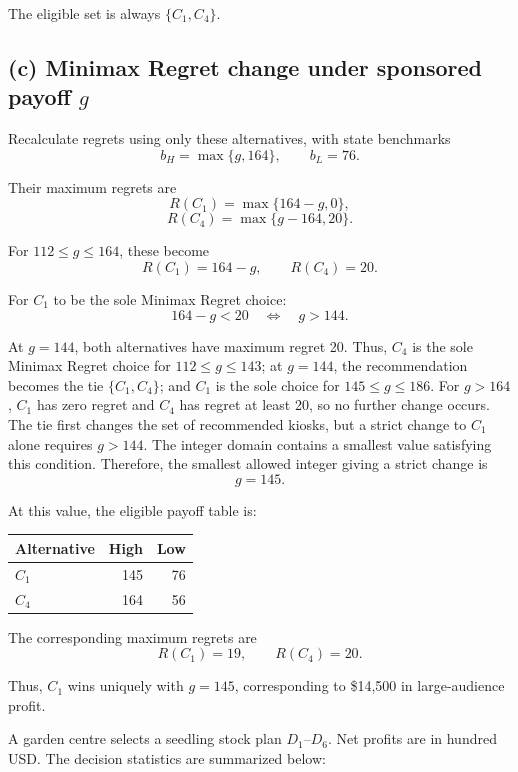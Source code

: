 The eligible set is always $\{C_1,C_4\}$.
\secInicio[sec:q2]

\label{sol:q2c}
\subsection*{(c) Minimax Regret change under sponsored payoff $g$ }

Recalculate regrets using only these alternatives,
with state benchmarks
\[
b_H=\max\{g,164\},\qquad b_L=76.
\]

Their maximum regrets are
\[
R(C_1)=\max\{164-g,0\},
\]
\[
R(C_4)=\max\{g-164,20\}.
\]

For $112\le g\le164$, these become
\[
R(C_1)=164-g,\qquad R(C_4)=20.
\]

For $C_1$ to be the sole Minimax Regret choice:
\[
164-g<20
\quad\Longleftrightarrow\quad g>144.
\]

At $g=144$, both alternatives have maximum regret 20.
Thus, $C_4$ is the sole Minimax Regret choice for $112\le g\le143$;
at $g=144$, the recommendation becomes the tie $\{C_1,C_4\}$;
and $C_1$ is the sole choice for $145\le g\le186$.
For $g>164$, $C_1$ has zero regret and $C_4$ has regret at least 20,
so no further change occurs.
The tie first changes the set of recommended kiosks, but a strict
change to $C_1$ alone requires $g>144$.
The integer domain contains a smallest value satisfying this condition.
Therefore, the smallest allowed integer giving a strict change is
\[
\boxed{g=145}.
\]

At this value, the eligible payoff table is:

\begin{center}\small\setlength{\tabcolsep}{4pt}
\begin{tabular}{lrr}\toprule
Alternative & High & Low\\ \midrule
$C_1$ & 145 & 76\\
$C_4$ & 164 & 56\\
\bottomrule
\end{tabular}
\end{center}

The corresponding maximum regrets are
\[
R(C_1)=19,\qquad R(C_4)=20.
\]

Thus, $C_1$ wins uniquely with $g=145$,
corresponding to \$14,500 in large-audience profit.
\secInicio[sec:q2]



A garden centre selects a seedling stock plan $D_1$--$D_6$. Net profits are in hundred USD. The decision statistics are summarized below:

